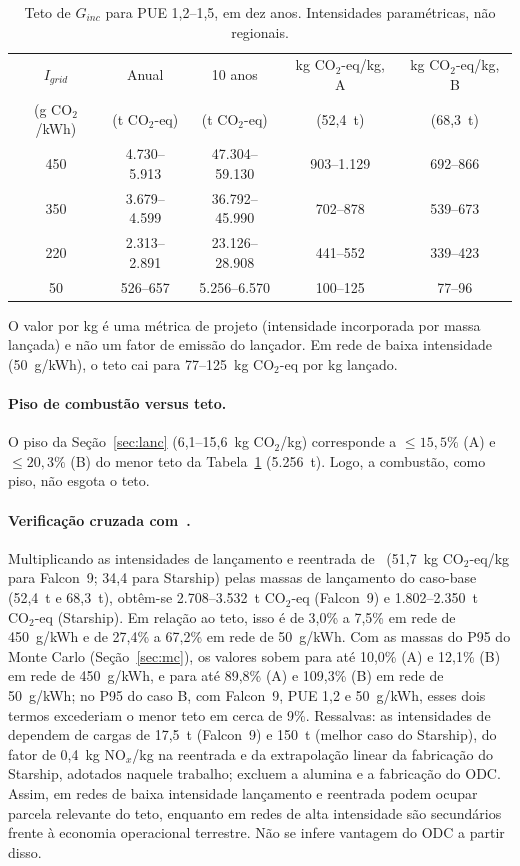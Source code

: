 \documentclass[11pt,a4paper]{article}
\newcommand{\CO}{\ensuremath{\mathrm{CO_2}}}
\newcommand{\COeq}{\ensuremath{\mathrm{CO_2}\text{-eq}}}
\begin{document}
\begin{table}[ht]
\centering
\caption{Teto de $G_{inc}$ para PUE 1,2--1,5, em dez anos. Intensidades
paramétricas, não regionais.}
\label{tab:teto}
\small
\begin{tabular}{@{}ccccc@{}}
\toprule
$I_{grid}$ & Anual & 10 anos & kg $\COeq$/kg, A & kg $\COeq$/kg, B\\
(g $\CO$/kWh) & (t $\COeq$) & (t $\COeq$) & (52,4~t) & (68,3~t)\\
\midrule
450 & 4.730--5.913 & 47.304--59.130 & 903--1.129 & 692--866\\
350 & 3.679--4.599 & 36.792--45.990 & 702--878   & 539--673\\
220 & 2.313--2.891 & 23.126--28.908 & 441--552   & 339--423\\
50  & 526--657     & 5.256--6.570   & 100--125   & 77--96\\
\bottomrule
\end{tabular}
\end{table}

O valor por kg é uma métrica de projeto (intensidade incorporada por massa
lançada) e não um fator de emissão do lançador. Em rede de baixa intensidade
(50~g/kWh), o teto cai para 77--125~kg $\COeq$ por kg lançado.

\paragraph{Piso de combustão versus teto.} O piso da Seção~\ref{sec:lanc}
(6,1--15,6~kg $\CO$/kg) corresponde a $\le 15{,}5\%$ (A) e $\le 20{,}3\%$ (B) do
menor teto da Tabela~\ref{tab:teto} (5.256~t). Logo, a combustão, como piso, não
esgota o teto.

\paragraph{Verificação cruzada com~\cite{r18}.} Multiplicando as intensidades
de lançamento e reentrada de~\cite{r18} (51,7~kg $\COeq$/kg para Falcon~9; 34,4
para Starship) pelas massas de lançamento do caso-base (52,4~t e 68,3~t),
obtêm-se 2.708--3.532~t $\COeq$ (Falcon~9) e 1.802--2.350~t $\COeq$ (Starship).
Em relação ao teto, isso é de 3,0\% a 7,5\% em rede de 450~g/kWh e de 27,4\% a
67,2\% em rede de 50~g/kWh. Com as massas do P95 do Monte Carlo
(Seção~\ref{sec:mc}), os valores sobem para até 10,0\% (A) e 12,1\% (B) em rede
de 450~g/kWh, e para até 89,8\% (A) e 109,3\% (B) em rede de 50~g/kWh; no P95 do
caso B, com Falcon~9, PUE 1,2 e 50~g/kWh, esses dois termos excederiam o menor
teto em cerca de 9\%. Ressalvas: as intensidades de~\cite{r18} dependem de
cargas de 17,5~t (Falcon~9) e 150~t (melhor caso do Starship), do fator de
0,4~kg NO$_x$/kg na reentrada e da extrapolação linear da fabricação do
Starship, adotados naquele trabalho; excluem a alumina e a fabricação do ODC.
Assim, em redes de baixa intensidade lançamento e reentrada podem ocupar parcela
relevante do teto, enquanto em redes de alta intensidade são secundários frente
à economia operacional terrestre. Não se infere vantagem do ODC a partir disso.
\end{document}
